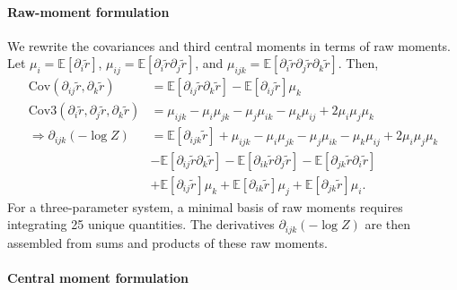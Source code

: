 \documentclass{article}
\begin{document}
\paragraph{Raw-moment formulation}

We rewrite the covariances and third central moments in terms of raw moments.
Let $\mu_{i} = \mathbb{E}[\partial_{i} \tilde{r}]$, $\mu_{ij} = \mathbb{E}[\partial_{i} \tilde{r} \partial_{j} \tilde{r}]$, and $\mu_{ijk} = \mathbb{E}[\partial_{i} \tilde{r} \partial_{j} \tilde{r} \partial_{k} \tilde{r}]$.
Then,
%
\begin{align}
  \mathrm{Cov}(\partial_{ij} \tilde{r}, \partial_{k} \tilde{r})                         & = \mathbb{E}[\partial_{ij} \tilde{r} \partial_{k} \tilde{r}] - \mathbb{E}[\partial_{ij} \tilde{r}] \mu_{k}                                                                                       \\
  \mathrm{Cov3}(\partial_{i} \tilde{r}, \partial_{j} \tilde{r}, \partial_{k} \tilde{r}) & = \mu_{ijk} - \mu_{i} \mu_{jk} - \mu_{j} \mu_{ik} - \mu_{k} \mu_{ij} + 2 \mu_{i} \mu_{j} \mu_{k}                                                                                                 \\
  \Rightarrow \partial_{ijk} (-\log Z)                                                  & = \mathbb{E}[\partial_{ijk} \tilde{r}] + \mu_{ijk} - \mu_{i} \mu_{jk} - \mu_{j} \mu_{ik} - \mu_{k} \mu_{ij} + 2 \mu_{i} \mu_{j} \mu_{k} \label{eq:neglogz-third-derivative-raw-moment}           \\
                                                                                        & - \mathbb{E}[\partial_{ij} \tilde{r} \partial_{k} \tilde{r}] - \mathbb{E}[\partial_{ik} \tilde{r} \partial_{j} \tilde{r}] - \mathbb{E}[\partial_{jk} \tilde{r} \partial_{i} \tilde{r}] \nonumber \\
                                                                                        & + \mathbb{E}[\partial_{ij} \tilde{r}] \mu_{k} + \mathbb{E}[\partial_{ik} \tilde{r}] \mu_{j} + \mathbb{E}[\partial_{jk} \tilde{r}] \mu_{i}. \nonumber
\end{align}
%
For a three-parameter system, a minimal basis of raw moments requires integrating 25 unique quantities.
The derivatives $\partial_{ijk} (-\log Z)$ are then assembled from sums and products of these raw moments.

\paragraph{Central moment formulation}
\end{document}
